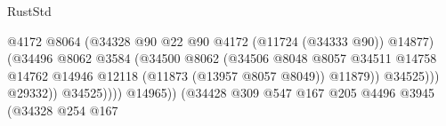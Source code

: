 \begin{lexlean}{RustStd}
\begin{coremodule}
                                                                @4172
                                                                @8064
                                                                (@34328
                                                                  @90
                                                                  @22
                                                                  @90
                                                                  @4172
                                                                  (@11724 (@34333 @90))
                                                                  @14877)
                                                                (@34496
                                                                  @8062
                                                                  @3584
                                                                  (@34500
                                                                    @8062
                                                                    (@34506
                                                                      @8048
                                                                      @8057
                                                                      @34511
                                                                      @14758
                                                                      @14762
                                                                      @14946
                                                                      @12118
                                                                      (@11873 (@13957 @8057 @8049))
                                                                      @11879))
                                                                  @34525)))
                                                            @29332))
                                                        @34525))))
                                                @14965))
                                            (@34428
                                              @309
                                              @547
                                              @167
                                              @205
                                              @4496
                                              @3945
                                              (@34328
                                                @254
                                                @167

\end{coremodule}
\end{lexlean}
